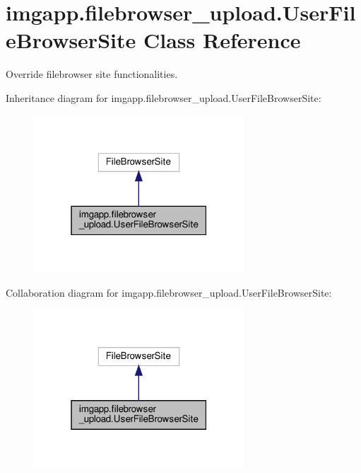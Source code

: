 \hypertarget{classimgapp_1_1filebrowser__upload_1_1UserFileBrowserSite}{}\section{imgapp.\+filebrowser\+\_\+upload.\+User\+File\+Browser\+Site Class Reference}
\label{classimgapp_1_1filebrowser__upload_1_1UserFileBrowserSite}


Override filebrowser site functionalities.  




Inheritance diagram for imgapp.\+filebrowser\+\_\+upload.\+User\+File\+Browser\+Site\+:\nopagebreak
\begin{figure}[H]
\begin{center}
\leavevmode
\includegraphics[width=223pt]{classimgapp_1_1filebrowser__upload_1_1UserFileBrowserSite__inherit__graph}
\end{center}
\end{figure}


Collaboration diagram for imgapp.\+filebrowser\+\_\+upload.\+User\+File\+Browser\+Site\+:\nopagebreak
\begin{figure}[H]
\begin{center}
\leavevmode
\includegraphics[width=223pt]{classimgapp_1_1filebrowser__upload_1_1UserFileBrowserSite__coll__graph}
\end{center}
\end{figure}

